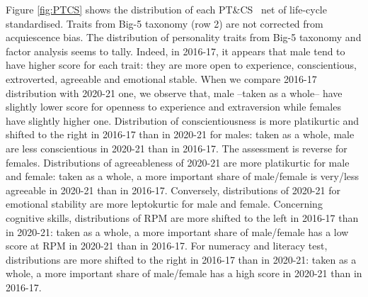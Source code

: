 \documentclass[a4paper, 11pt, onecolumn]{article}
\newcommand{\PTCS}{PT\&CS}
\begin{document}
Figure \ref{fig:PTCS} shows the distribution of each \PTCS~ net of life-cycle standardised.
Traits from Big-5 taxonomy (row 2) are not corrected from acquiescence bias.
The distribution of personality traits from Big-5 taxonomy and factor analysis seems to tally.
Indeed, in 2016-17, it appears that male tend to have higher score for each trait: they are more open to experience, conscientious, extroverted, agreeable and emotional stable.
When we compare 2016-17 distribution with 2020-21 one, we observe that, male --taken as a whole-- have slightly lower score for openness to experience and extraversion while females have slightly higher one.
Distribution of conscientiousness is more platikurtic and shifted to the right in 2016-17 than in 2020-21 for males: taken as a whole, male are less conscientious in 2020-21 than in 2016-17.
The assessment is reverse for females.
Distributions of agreeableness of 2020-21 are more platikurtic for male and female: taken as a whole, a more important share of male/female is very/less agreeable in 2020-21 than in 2016-17.
Conversely, distributions of 2020-21 for emotional stability are more leptokurtic for male and female.
Concerning cognitive skills, distributions of RPM are more shifted to the left in 2016-17 than in 2020-21: taken as a whole, a more important share of male/female has a low score at RPM in 2020-21 than in 2016-17.
For numeracy and literacy test, distributions are more shifted to the right in 2016-17 than in 2020-21: taken as a whole, a more important share of male/female has a high score in 2020-21 than in 2016-17.
\end{document}
